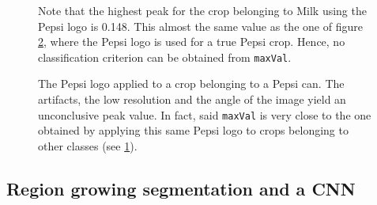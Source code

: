 \documentclass[../main.tex]{subfiles}
\begin{document}
\begin{figure}[h]
    \centering
    \caption{Note that the highest peak for the crop belonging to Milk using the Pepsi logo is 0.148. This almost the same value as the one of figure \ref{fig:4pepsi_crop_TM}, where the Pepsi logo is used for a true Pepsi crop. Hence, no classification criterion can be obtained from \texttt{maxVal}.}
    \label{fig:0pepsiVSmilk_crop_TM}
\end{figure}

\begin{figure}[htbp]
    \centering
    \caption{The Pepsi logo applied to a crop belonging to a Pepsi can. The artifacts, the low resolution and the angle of the image yield an unconclusive peak value. In fact, said \texttt{maxVal} is very close to the one obtained by applying this same Pepsi logo to crops belonging to other classes (see \ref{fig:0pepsiVSmilk_crop_TM}).}
    \label{fig:4pepsi_crop_TM}
\end{figure}

\subsection{Region growing segmentation and a CNN}
\end{document}
